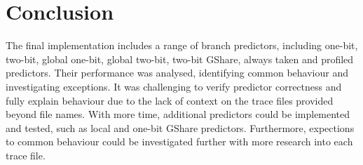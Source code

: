 \section{Conclusion}
The final implementation includes a range of branch predictors, including one-bit, two-bit, global one-bit, global two-bit, two-bit GShare, always taken and profiled predictors. Their performance was analysed, identifying common behaviour and investigating exceptions. It was challenging to verify predictor correctness and fully explain behaviour due to the lack of context on the trace files provided beyond file names. With more time, additional predictors could be implemented and tested, such as local and one-bit GShare predictors. Furthermore, expections to common behaviour could be investigated further with more research into each trace file.